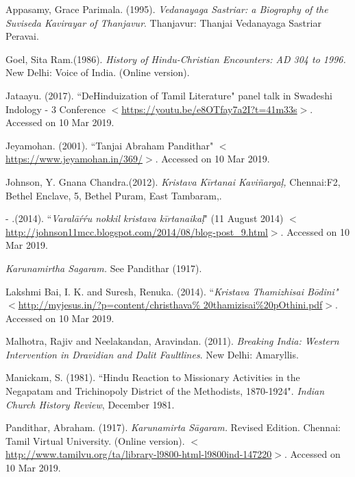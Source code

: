 \begin{thebibliography}{99}
\itemsep=0pt

  Appasamy, Grace Parimala. (1995). \textit{Vedanayaga Sastriar: a Biography of the Suviseda Kavirayar of Thanjavur}. Thanjavur: Thanjai Vedanayaga Sastriar Peravai.

  Goel, Sita Ram.(1986).\textit{ History of Hindu-Christian Encounters: AD 304 to 1996. }New Delhi: Voice of India. (Online version).

  Jataayu. (2017). ``DeHinduization of Tamil Literature" panel talk in Swadeshi Indology - 3 Conference $<$\url{https://youtu.be/e8OTfay7a2I?t=41m33s}$>$. Accessed on 10 Mar 2019.

  Jeyamohan. (2001). ``Tanjai Abraham Pandithar" $<$\url{https://www.jeyamohan.in/369/}$>$. Accessed on 10 Mar 2019.

  Johnson, Y. Gnana Chandra.(2012).\textit{ Kristava Kīrtanai Kaviñargaḷ, }Chennai:F2, Bethel Enclave, 5, Bethel Puram, East Tambaram,.

  - .(2014). ``\textit{Varalāŕŕu nokkil kristava kīrtanaikaḷ}" (11 August 2014) $<$\url{http://johnson11mcc.blogspot.com/2014/08/blog-post_9.html}$>$. Accessed on 10 Mar 2019.

  \textit{Karunamirtha Sagaram. }See Pandithar (1917).

  Lakshmi Bai, I. K. and Suresh, Renuka. (2014). ``\textit{Kristava Thamizhisai Bōdini"} $<$\url{http://myjesus.in/?p=content/christhava\% 20thamizisai\%20pOthini.pdf}$>$. Accessed on 10 Mar 2019.

  Malhotra, Rajiv and Neelakandan, Aravindan. (2011). \textit{Breaking India: Western Intervention in Dravidian and Dalit Faultlines}. New Delhi: Amaryllis.

  Manickam, S. (1981). ``Hindu Reaction to Missionary Activities in the Negapatam and Trichinopoly District of the Methodists, 1870-1924". \textit{Indian Church History Review}, December 1981.

  Pandithar, Abraham. (1917). \textit{Karunamirta Sāgaram. }Revised Edition. Chennai: Tamil Virtual University. (Online version). $<$\url{http://www.tamilvu.org/ta/library-l9800-html-l9800ind-147220}$>$. Accessed on 10 Mar 2019.


\end{thebibliography}
